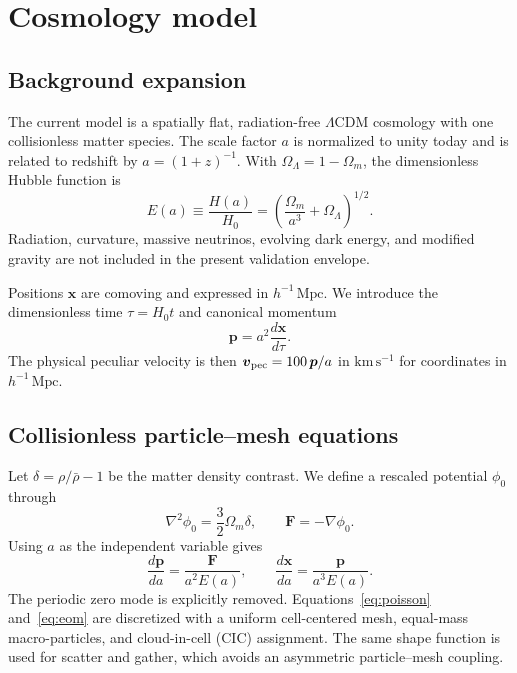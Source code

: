 \documentclass[11pt]{article}
\begin{document}
\section{Cosmology model}
\label{sec:model}

\subsection{Background expansion}

The current model is a spatially flat, radiation-free $\Lambda$CDM cosmology
with one collisionless matter species.  The scale factor $a$ is normalized to
unity today and is related to redshift by $a=(1+z)^{-1}$.  With
$\Omega_\Lambda=1-\Omega_m$, the dimensionless Hubble function is
\begin{equation}
  E(a) \equiv \frac{H(a)}{H_0}
  = \left(\frac{\Omega_m}{a^3}+\Omega_\Lambda\right)^{1/2}.
  \label{eq:hubble}
\end{equation}
Radiation, curvature, massive neutrinos, evolving dark energy, and modified
gravity are not included in the present validation envelope.

Positions $\boldsymbol{x}$ are comoving and expressed in
$h^{-1}\,\mathrm{Mpc}$.  We introduce the dimensionless time
$\tau=H_0t$ and canonical momentum
\begin{equation}
  \boldsymbol{p}=a^2\frac{d\boldsymbol{x}}{d\tau}.
  \label{eq:momentum}
\end{equation}
The physical peculiar velocity is then
$\boldsymbol{v}_{\rm pec}=100\,\boldsymbol{p}/a$ in
$\mathrm{km}\,\mathrm{s}^{-1}$ for coordinates in $h^{-1}\,\mathrm{Mpc}$.

\subsection{Collisionless particle--mesh equations}

Let $\delta=\rho/\bar\rho-1$ be the matter density contrast.  We define a
rescaled potential $\phi_0$ through
\begin{equation}
  \nabla^2\phi_0 = \frac{3}{2}\Omega_m\delta,
  \qquad
  \boldsymbol{F}=-\nabla\phi_0.
  \label{eq:poisson}
\end{equation}
Using $a$ as the independent variable gives
\begin{equation}
  \frac{d\boldsymbol{p}}{da}
    = \frac{\boldsymbol{F}}{a^2E(a)},
  \qquad
  \frac{d\boldsymbol{x}}{da}
    = \frac{\boldsymbol{p}}{a^3E(a)}.
  \label{eq:eom}
\end{equation}
The periodic zero mode is explicitly removed.  Equations~\eqref{eq:poisson}
and~\eqref{eq:eom} are discretized with a uniform cell-centered mesh, equal-mass
macro-particles, and cloud-in-cell (CIC) assignment.  The same shape function is
used for scatter and gather, which avoids an asymmetric particle--mesh coupling.
\end{document}
